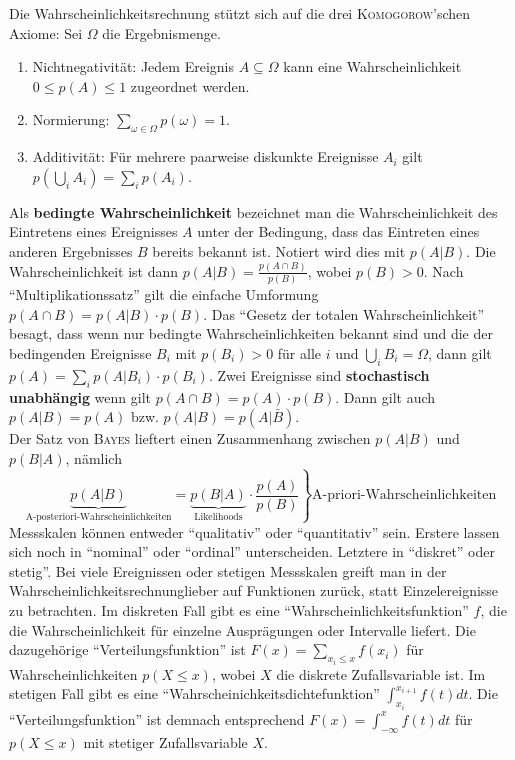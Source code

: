 Die Wahrscheinlichkeitsrechnung stützt sich auf die drei \textsc{Komogorow}'schen Axiome: Sei \(\Omega\) die Ergebnismenge.
\begin{enumerate}
	\item Nichtnegativität: Jedem Ereignis \(A \subseteq \Omega\) kann eine Wahrscheinlichkeit \(0 \leq p(A) \leq 1\) zugeordnet werden.
	\item Normierung: \(\sum_{\omega\in\Omega} p(\omega) = 1\).
	\item Additivität: Für mehrere paarweise diskunkte Ereignisse \(A_i\) gilt \(p(\bigcup_{i} A_i) = \sum_{i} p(A_i)\).
\end{enumerate}
Als \textbf{bedingte Wahrscheinlichkeit} bezeichnet man die Wahrscheinlichkeit des Eintretens eines Ereignisses \(A\) unter der Bedingung, dass das Eintreten eines anderen Ergebnisses \(B\) bereits bekannt ist. Notiert wird dies mit \(p(A \vert B)\). Die Wahrscheinlichkeit ist dann \(p(A \vert B) = \frac{p(A \cap B)}{p(B)}\), wobei \(p(B) > 0\). Nach ``Multiplikationssatz'' gilt die einfache Umformung \(p(A \cap B) = p(A \vert B) \cdot p(B)\). Das ``Gesetz der totalen Wahrscheinlichkeit'' besagt, dass wenn nur bedingte Wahrscheinlichkeiten bekannt sind und die der bedingenden Ereignisse \(B_i\) mit \(p(B_i) > 0\) für alle \(i\) und \(\bigcup_i B_i = \Omega\), dann gilt \(p(A) = \sum_i p(A \vert B_i) \cdot p(B_i)\).
Zwei Ereignisse sind \textbf{stochastisch unabhängig} wenn gilt \(p(A \cap B) = p(A) \cdot p(B)\). Dann gilt auch \(p(A \vert B) = p(A)\) bzw. \(p(A \vert B) = p(A \vert \bar{B})\).\\
Der Satz von \textsc{Bayes} lieftert einen Zusammenhang zwischen \(p(A \vert B)\) und \(p(B \vert A)\), nämlich
\[
	\left.\underbrace{p(A \vert B)}_{\text{A-posteriori-Wahrscheinlichkeiten}} = \underbrace{p(B \vert A)}_{\text{Likelihoods}} \cdot \frac{p(A)}{p(B)}\right\rbrace\text{A-priori-Wahrscheinlichkeiten}
\]
Messskalen können entweder ``qualitativ'' oder ``quantitativ'' sein. Erstere lassen sich noch in ``nominal'' oder ``ordinal'' unterscheiden. Letztere in ``diskret'' oder stetig''. Bei viele Ereignissen oder stetigen Messskalen greift man in der Wahrscheinlichkeitsrechnunglieber auf Funktionen zurück, statt Einzelereignisse zu betrachten. Im diskreten Fall gibt es eine ``Wahrscheinlichkeitsfunktion'' \(f\), die die Wahrscheinlichkeit für einzelne Ausprägungen oder Intervalle liefert. Die dazugehörige ``Verteilungsfunktion'' ist \(F(x) = \sum_{x_i \leq x} f(x_i)\) für Wahrscheinlichkeiten \(p(X \leq x)\), wobei \(X\) die diskrete Zufallsvariable ist. Im stetigen Fall gibt es eine ``Wahrscheinichkeitsdichtefunktion'' \(\int_{x_i}^{x_{i+1}} f(t) dt\). Die ``Verteilungsfunktion'' ist demnach entsprechend \(F(x) = \int_{-\infty}^{x} f(t) dt\) für \(p(X \leq x)\) mit stetiger Zufallsvariable \(X\).\\
